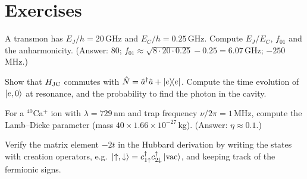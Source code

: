 \section{Exercises}
\begin{exercise}
A transmon has $E_J/h=20$\,GHz and $E_C/h=0.25$\,GHz. Compute $E_J/E_C$, $f_{01}$ and the anharmonicity. (Answer: $80$; $f_{01}\approx\sqrt{8\cdot20\cdot0.25}-0.25=6.07$\,GHz; $-250$\,MHz.)
\end{exercise}
\begin{exercise}
Show that $H_{\rm JC}$ commutes with $\hat N=\hat a^\dagger\hat a+\left|e\middle\rangle\!\middle\langle e\right|$. Compute the time evolution of $\left|e,0\right\rangle$ at resonance, and the probability to find the photon in the cavity.
\end{exercise}
\begin{exercise}
For a $^{40}$Ca$^+$ ion with $\lambda=729$\,nm and trap frequency $\nu/2\pi=1$\,MHz, compute the Lamb--Dicke parameter (mass $40\times1.66\times10^{-27}$\,kg). (Answer: $\eta\approx0.1$.)
\end{exercise}
\begin{exercise}
Verify the matrix element $-2t$ in the Hubbard derivation by writing the states with creation operators, e.g.\ $\left|\uparrow,\downarrow\right\rangle=c^\dagger_{1\uparrow}c^\dagger_{2\downarrow}\left|\rm vac\right\rangle$, and keeping track of the fermionic signs.
\end{exercise}
